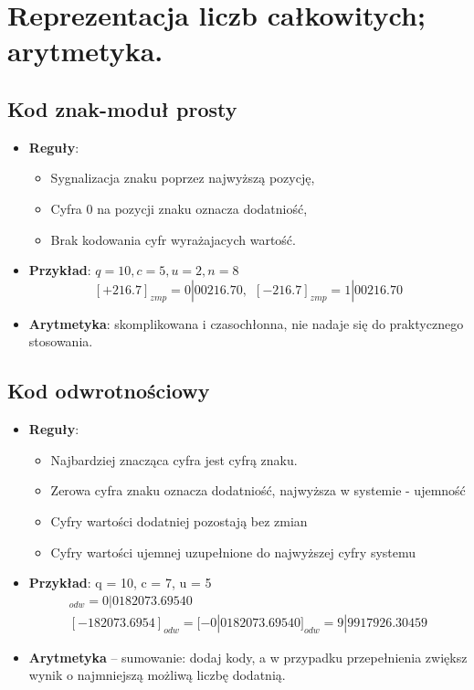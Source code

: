 \documentclass[main.tex]{subfiles}
\begin{document}
    \section{Reprezentacja liczb całkowitych; arytmetyka.}

    \subsection{Kod znak-moduł prosty}
    \begin{itemize}
        \item \textbf{Reguły}:
        \begin{itemize}[noitemsep]
            \item Sygnalizacja znaku poprzez najwyższą pozycję,
            \item Cyfra 0 na pozycji znaku oznacza dodatniość,
            \item Brak kodowania cyfr wyrażajacych wartość.
        \end{itemize}
        \item \textbf{Przykład}: $q = 10, c = 5, u = 2, n = 8$
        \[[+216.7]_{zmp} = 0|00216.70, ~~ [-216.7]_{zmp} = 1|00216.70\]
        \item \textbf{Arytmetyka}: skomplikowana i czasochłonna, nie nadaje się do praktycznego stosowania.
    \end{itemize}

    \subsection{Kod odwrotnościowy}
    \begin{itemize}
        \item \textbf{Reguły}:
        \begin{itemize}[noitemsep]
            \item Najbardziej znacząca cyfra jest cyfrą znaku.
            \item Zerowa cyfra znaku oznacza dodatniość, najwyższa w systemie - ujemność
            \item Cyfry wartości dodatniej pozostają bez zmian
            \item Cyfry wartości ujemnej uzupełnione do najwyższej cyfry systemu
        \end{itemize}

        \item \textbf{Przykład}: q = 10, c = 7, u = 5
        \begin{gather*}
        [182073.6954]
            _{odw} = 0|0182073.69540\\
            [-182073.6954]_{odw} = [-0|0182073.69540]_{odw} = 9|9917926.30459
        \end{gather*}

        \item \textbf{Arytmetyka} -- sumowanie: dodaj kody, a w przypadku przepełnienia zwiększ wynik o najmniejszą
        możliwą liczbę dodatnią.
    \end{itemize}
\end{document}
